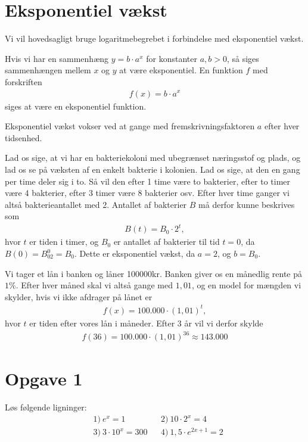 \section*{Eksponentiel vækst}
Vi vil hovedsagligt bruge logaritmebegrebet i forbindelse med eksponentiel vækst. 
\begin{defn}
Hvis vi har en sammenhæng $y = b\cdot a^x$ for konstanter $a,b>0$, så siges sammenhængen mellem $x$ og $y$ at være eksponentiel. En funktion $f$ med forskriften
\begin{align*}
f(x) = b\cdot a^x
\end{align*}
siges at være en eksponentiel funktion. 
\end{defn}
Eksponentiel vækst vokser ved at gange med fremskrivningsfaktoren $a$ efter hver tidsenhed.
\begin{exa}\label{exa:bacteria}
Lad os sige, at vi har en bakteriekoloni med ubegrænset næringsstof og plads, og lad os se på væksten af en enkelt bakterie i kolonien. Lad os sige, at den en gang per time deler sig i to. Så vil den efter 1 time være to bakterier, efter to timer være 4 bakterier, efter 3 timer være 8 bakterier osv. Efter hver time ganger vi altså bakterieantallet med 2. Antallet af bakterier $B$ må derfor kunne beskrives som 
\begin{align*}
B(t) = B_0\cdot 2^t,
\end{align*}
hvor $t$ er tiden i timer, og $B_0$ er antallet af bakterier til tid $t=0$, da $B(0) = B_02^0 = B_0.$
Dette er eksponentiel vækst, da $a = 2$, og $b = B_0$.
\end{exa}
\begin{exa}\label{exa:loan}
Vi tager et lån i banken og låner 100000kr. Banken giver os en månedlig rente på $1\%$. Efter hver måned skal vi altså gange med $1,01$, og en model for mængden vi skylder, hvis vi ikke afdrager på lånet er
\begin{align*}
f(x) = 100.000\cdot (1,01)^t,
\end{align*}
hvor $t$ er tiden efter vores lån i måneder. Efter 3 år vil vi derfor skylde
\begin{align*}
f(36) = 100.000\cdot (1,01)^{36} \approx 143.000
\end{align*}
\end{exa} 
\section*{Opgave 1}
Løs følgende ligninger:
\begin{align*}
&1) \  e^x = 1  &&2) \ 10\cdot 2^x = 4   \\
&3) \ 3\cdot 10^x = 300   &&4) \ 1,5\cdot e^{2x+1} = 2   \\
\end{align*}

